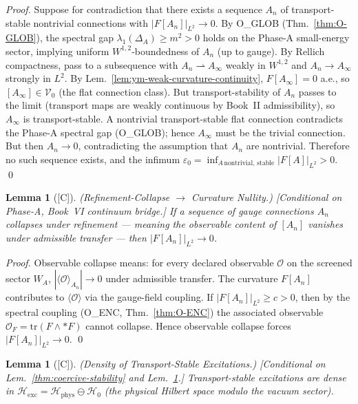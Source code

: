\documentclass[12pt,oneside]{amsbook}
\theoremstyle{plain}
\newtheorem{lemma}[theorem]{Lemma}
\theoremstyle{definition}
\theoremstyle{remark}
\newcommand{\status}[1]{\textup{[#1]}}
\begin{document}
\begin{proof}
Suppose for contradiction that there exists a sequence $A_n$ of
transport-stable nontrivial connections with $|F[A_n]|_{L^2} \to 0$.
By O\_GLOB (Thm.~\ref{thm:O-GLOB}), the spectral gap
$\lambda_1(\Delta_A) \geq m^2 > 0$ holds on the Phase-A small-energy
sector, implying uniform $W^{1,2}$-boundedness of $A_n$ (up to
gauge). By Rellich compactness, pass to a subsequence with
$A_n \rightharpoonup A_\infty$ weakly in $W^{1,2}$ and
$A_n \to A_\infty$ strongly in $L^2$.
By Lem.~\ref{lem:ym-weak-curvature-continuity}, $F[A_\infty] = 0$
a.e., so $[A_\infty] \in \mathcal{V}_0$ (the flat connection
class). But transport-stability of $A_n$ passes to the limit
(transport maps are weakly continuous by Book~II admissibility), so
$A_\infty$ is transport-stable. A nontrivial transport-stable
flat connection contradicts the Phase-A spectral gap (O\_GLOB);
hence $A_\infty$ must be the trivial connection. But then $A_n
\to 0$, contradicting the assumption that $A_n$ are nontrivial.
Therefore no such sequence exists, and the infimum
$\varepsilon_0 = \inf_{A\,\mathrm{nontrivial,\, stable}}
|F[A]|_{L^2} > 0$. \qed
\end{proof}

\begin{lemma}[\status{C}]\label{thm:refinement-collapse-nullity}
\textup{(Refinement-Collapse $\to$ Curvature Nullity.)}
\textup{[Conditional on Phase-A, Book~VI continuum bridge.]}
If a sequence of gauge connections $A_n$ collapses under refinement
--- meaning the observable content of $[A_n]$ vanishes under
admissible transfer --- then $|F[A_n]|_{L^2} \to 0$.
\end{lemma}

\begin{proof}
Observable collapse means: for every declared observable
$\mathcal{O}$ on the screened sector $W_A$,
$|\langle \mathcal{O} \rangle_{A_n}| \to 0$ under admissible
transfer. The curvature $F[A_n]$ contributes to
$\langle \mathcal{O} \rangle$ via the gauge-field coupling.
If $|F[A_n]|_{L^2} \geq c > 0$, then by the spectral coupling
(O\_ENC, Thm.~\ref{thm:O-ENC}) the associated observable
$\mathcal{O}_F = \mathrm{tr}(F \wedge {*}F)$ cannot collapse.
Hence observable collapse forces $|F[A_n]|_{L^2} \to 0$. \qed
\end{proof}

\begin{lemma}[\status{C}]\label{thm:density-transport-stable}
\textup{(Density of Transport-Stable Excitations.)}
\textup{[Conditional on Lem.~\ref{thm:coercive-stability} and
Lem.~\ref{thm:refinement-collapse-nullity}.]}
Transport-stable excitations are dense in $\mathcal{H}_{\mathrm{exc}}
= \mathcal{H}_{\mathrm{phys}} \ominus \mathcal{H}_0$ (the physical
Hilbert space modulo the vacuum sector).
\end{lemma}
\end{document}
